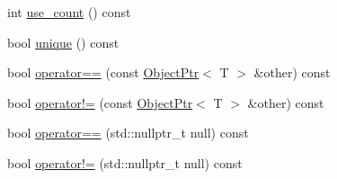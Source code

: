 \begin{DoxyCompactItemize}
int \hyperlink{classtvm_1_1runtime_1_1ObjectPtr_a6e21dd2172469145baa7bf4d12a998ce}{use\+\_\+count} () const 
\item 
bool \hyperlink{classtvm_1_1runtime_1_1ObjectPtr_a34b83145402b1340466d1ea7e667cd27}{unique} () const 
\item 
bool \hyperlink{classtvm_1_1runtime_1_1ObjectPtr_a687b3081346f3b35bee5abc77640e3ae}{operator==} (const \hyperlink{classtvm_1_1runtime_1_1ObjectPtr}{Object\+Ptr}$<$ T $>$ \&other) const 
\item 
bool \hyperlink{classtvm_1_1runtime_1_1ObjectPtr_a7f135e291e6773f18c89d2af837e02da}{operator!=} (const \hyperlink{classtvm_1_1runtime_1_1ObjectPtr}{Object\+Ptr}$<$ T $>$ \&other) const 
\item 
bool \hyperlink{classtvm_1_1runtime_1_1ObjectPtr_aa05e0ea44b9ce636b4b9a9c1f7abab4c}{operator==} (std\+::nullptr\+\_\+t null) const 
\item 
bool \hyperlink{classtvm_1_1runtime_1_1ObjectPtr_a739e2e97c1b3c6f41abaf937acd899ed}{operator!=} (std\+::nullptr\+\_\+t null) const 
\end{DoxyCompactItemize}
